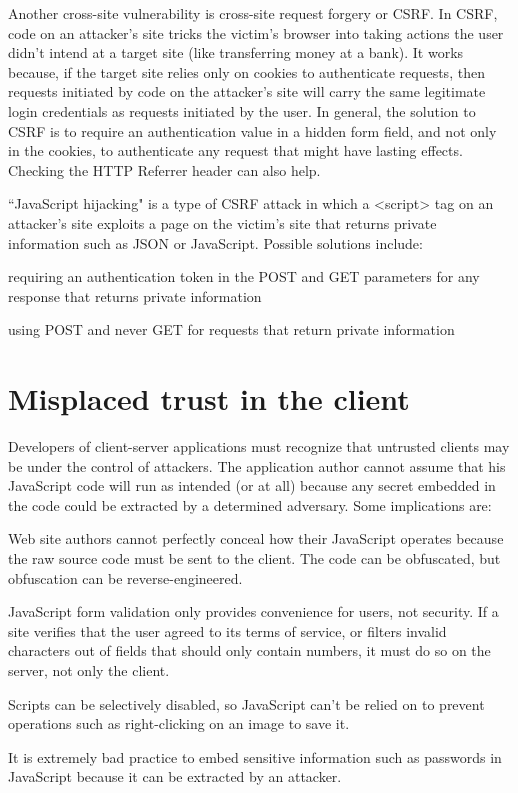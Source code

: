 Another cross-site vulnerability is cross-site request forgery or CSRF. In CSRF, code on an attacker's site tricks the victim's browser into taking actions the user didn't intend at a target site (like transferring money at a bank). It works because, if the target site relies only on cookies to authenticate requests, then requests initiated by code on the attacker's site will carry the same legitimate login credentials as requests initiated by the user. In general, the solution to CSRF is to require an authentication value in a hidden form field, and not only in the cookies, to authenticate any request that might have lasting effects. Checking the HTTP Referrer header can also help.


``JavaScript hijacking" is a type of CSRF attack in which a <script> tag on an attacker's site exploits a page on the victim's site that returns private information such as JSON or JavaScript. Possible solutions include:


\begin{compactitem}
\item requiring an authentication token in the POST and GET parameters for any response that returns private information
\item using POST and never GET for requests that return private information
\end{compactitem}

\section{Misplaced trust in the client}

Developers of client-server applications must recognize that untrusted clients may be under the control of attackers. The application author cannot assume that his JavaScript code will run as intended (or at all) because any secret embedded in the code could be extracted by a determined adversary. Some implications are:

\begin{compactitem}
\item Web site authors cannot perfectly conceal how their JavaScript operates because the raw source code must be sent to the client. The code can be obfuscated, but obfuscation can be reverse-engineered.
\item JavaScript form validation only provides convenience for users, not security. If a site verifies that the user agreed to its terms of service, or filters invalid characters out of fields that should only contain numbers, it must do so on the server, not only the client.
\item Scripts can be selectively disabled, so JavaScript can't be relied on to prevent operations such as right-clicking on an image to save it.
\item It is extremely bad practice to embed sensitive information such as passwords in JavaScript because it can be extracted by an attacker.
\end{compactitem}


